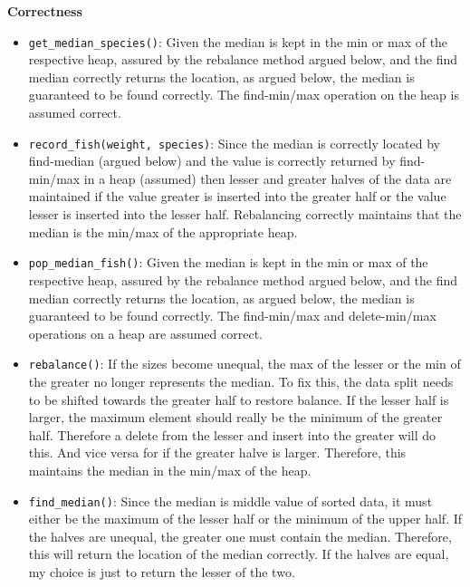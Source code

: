 \documentclass[12pt,twoside]{article}
\begin{document}
\begin{problems}
\begin{problemparts}
    \smallbreak

    {\bf Correctness}
    \begin{itemize}
        \item {\tt get\_median\_species()}: Given the median is kept in the
        min or max of the respective heap, assured by the rebalance method
        argued below, and the find median correctly returns the location, as
        argued below, the median is guaranteed to be found correctly. The
        find-min/max operation on the heap is assumed correct.
        \item {\tt record\_fish(weight, species)}: Since the median is
        correctly located by find-median (argued below) and the value is
        correctly returned by find-min/max in a heap (assumed) then lesser
        and greater halves of the data are maintained if the value greater is
        inserted into the greater half or the value lesser is inserted into
        the lesser half. Rebalancing correctly maintains that the median is
        the min/max of the appropriate heap.
        \item {\tt pop\_median\_fish()}: Given the median is kept in the min
        or max of the respective heap, assured by the rebalance method argued
        below, and the find median correctly returns the location, as argued
        below, the median is guaranteed to be found correctly. The
        find-min/max and delete-min/max operations on a heap are assumed
        correct.
        \item {\tt rebalance()}: If the sizes become unequal, the max of the
        lesser or the min of the greater no longer represents the median. To
        fix this, the data split needs to be shifted towards the greater half
        to restore balance. If the lesser half is larger, the maximum element
        should really be the minimum of the greater half. Therefore a delete
        from the lesser and insert into the greater will do this. And vice
        versa for if the greater halve is larger. Therefore, this maintains
        the median in the min/max of the heap.
        \item {\tt find\_median()}: Since the median is middle value of
        sorted data, it must either be the maximum of the lesser half or the
        minimum of the upper half. If the halves are unequal, the greater one
        must contain the median. Therefore, this will return the location of
        the median correctly. If the halves are equal, my choice is just to
        return the lesser of the two.
    \end{itemize}


\end{problemparts}
\end{problems}
\end{document}
